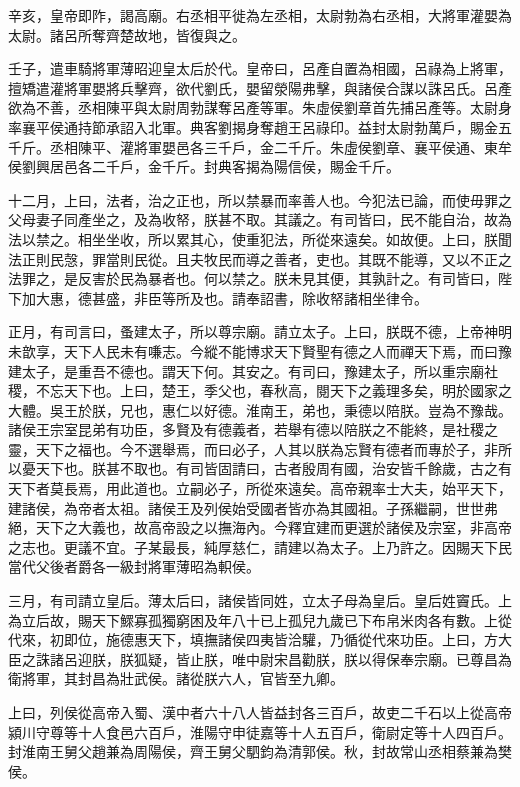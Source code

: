 辛亥，皇帝即阼，謁高廟。右丞相平徙為左丞相，太尉勃為右丞相，大將軍灌嬰為太尉。諸呂所奪齊楚故地，皆復與之。

壬子，遣車騎將軍薄昭迎皇太后於代。皇帝曰，呂產自置為相國，呂祿為上將軍，擅矯遣灌將軍嬰將兵擊齊，欲代劉氏，嬰留滎陽弗擊，與諸侯合謀以誅呂氏。呂產欲為不善，丞相陳平與太尉周勃謀奪呂產等軍。朱虛侯劉章首先捕呂產等。太尉身率襄平侯通持節承詔入北軍。典客劉揭身奪趙王呂祿印。益封太尉勃萬戶，賜金五千斤。丞相陳平、灌將軍嬰邑各三千戶，金二千斤。朱虛侯劉章、襄平侯通、東牟侯劉興居邑各二千戶，金千斤。封典客揭為陽信侯，賜金千斤。

十二月，上曰，法者，治之正也，所以禁暴而率善人也。今犯法已論，而使毋罪之父母妻子同產坐之，及為收帑，朕甚不取。其議之。有司皆曰，民不能自治，故為法以禁之。相坐坐收，所以累其心，使重犯法，所從來遠矣。如故便。上曰，朕聞法正則民愨，罪當則民從。且夫牧民而導之善者，吏也。其既不能導，又以不正之法罪之，是反害於民為暴者也。何以禁之。朕未見其便，其孰計之。有司皆曰，陛下加大惠，德甚盛，非臣等所及也。請奉詔書，除收帑諸相坐律令。

正月，有司言曰，蚤建太子，所以尊宗廟。請立太子。上曰，朕既不德，上帝神明未歆享，天下人民未有嗛志。今縱不能博求天下賢聖有德之人而禪天下焉，而曰豫建太子，是重吾不德也。謂天下何。其安之。有司曰，豫建太子，所以重宗廟社稷，不忘天下也。上曰，楚王，季父也，春秋高，閱天下之義理多矣，明於國家之大體。吳王於朕，兄也，惠仁以好德。淮南王，弟也，秉德以陪朕。豈為不豫哉。諸侯王宗室昆弟有功臣，多賢及有德義者，若舉有德以陪朕之不能終，是社稷之靈，天下之福也。今不選舉焉，而曰必子，人其以朕為忘賢有德者而專於子，非所以憂天下也。朕甚不取也。有司皆固請曰，古者殷周有國，治安皆千餘歲，古之有天下者莫長焉，用此道也。立嗣必子，所從來遠矣。高帝親率士大夫，始平天下，建諸侯，為帝者太祖。諸侯王及列侯始受國者皆亦為其國祖。子孫繼嗣，世世弗絕，天下之大義也，故高帝設之以撫海內。今釋宜建而更選於諸侯及宗室，非高帝之志也。更議不宜。子某最長，純厚慈仁，請建以為太子。上乃許之。因賜天下民當代父後者爵各一級封將軍薄昭為軹侯。

三月，有司請立皇后。薄太后曰，諸侯皆同姓，立太子母為皇后。皇后姓竇氏。上為立后故，賜天下鰥寡孤獨窮困及年八十已上孤兒九歲已下布帛米肉各有數。上從代來，初即位，施德惠天下，填撫諸侯四夷皆洽驩，乃循從代來功臣。上曰，方大臣之誅諸呂迎朕，朕狐疑，皆止朕，唯中尉宋昌勸朕，朕以得保奉宗廟。已尊昌為衛將軍，其封昌為壯武侯。諸從朕六人，官皆至九卿。

上曰，列侯從高帝入蜀、漢中者六十八人皆益封各三百戶，故吏二千石以上從高帝潁川守尊等十人食邑六百戶，淮陽守申徒嘉等十人五百戶，衛尉定等十人四百戶。封淮南王舅父趙兼為周陽侯，齊王舅父駟鈞為清郭侯。秋，封故常山丞相蔡兼為樊侯。

